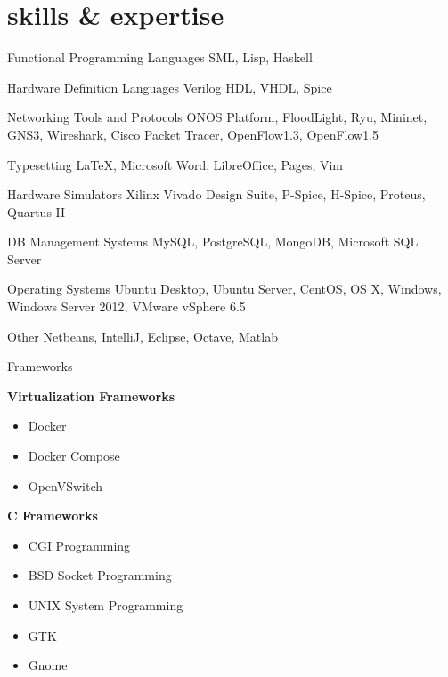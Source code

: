 \documentclass[]{friggeri-cv} %
\begin{document}
\section{skills \& expertise}

\begin{entrylist}

	\entry{\textcolor{TextGreen}{$\bullet$}}
	{Functional Programming Languages}
	{}
	{SML, Lisp, Haskell}


	\entry{\textcolor{TextOrange}{$\bullet$}}
	{Hardware Definition Languages}
	{}
	{Verilog HDL, VHDL, Spice}


	\entry{\textcolor{DarkBlue}{$\bullet$}}
	{Networking Tools and Protocols}
	{}
	{ONOS Platform, FloodLight, Ryu, Mininet, GNS3, Wireshark, Cisco Packet Tracer, OpenFlow1.3, OpenFlow1.5}


	\entry{\textcolor{Ocean}{$\bullet$}}
	{Typesetting}
	{}
	{\LaTeX, Microsoft Word, LibreOffice, Pages, Vim}


	\entry{\textcolor{LightGray}{$\bullet$}}
	{Hardware Simulators}
	{}
	{Xilinx Vivado Design Suite, P-Spice, H-Spice, Proteus, Quartus II}


	\entry{\textcolor{TextYellow}{$\bullet$}}
	{DB Management Systems}
	{}
	{MySQL, PostgreSQL, MongoDB, Microsoft SQL Server}


	\entry{\textcolor{TextRed}{$\bullet$}}
	{Operating Systems}
	{}
	{Ubuntu Desktop, Ubuntu Server, CentOS, OS X, Windows, Windows Server 2012, VMware vSphere 6.5}


	\entry{\textcolor{TextPink}{$\bullet$}}
	{Other}
	{}
	{Netbeans, IntelliJ, Eclipse, Octave, Matlab}


	\entry{\textcolor{UniBlue}{$\bullet$}}
	{Frameworks}
	{}
	{
		\textbf{Virtualization Frameworks}
		\begin{itemize}
			\item Docker
			\item Docker Compose
			\item OpenVSwitch
		\end{itemize}
		\textbf{C Frameworks}
		\begin{itemize}
			\item CGI Programming
			\item BSD Socket Programming
			\item UNIX System Programming
			\item GTK
			\item Gnome
		\end{itemize}
	
}
\end{entrylist}
\end{document}

